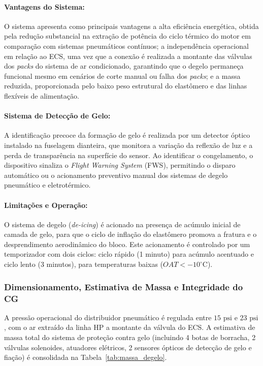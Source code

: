 \paragraph{Vantagens do Sistema:} O sistema apresenta como principais vantagens a alta eficiência energética, obtida pela redução substancial na extração de potência do ciclo térmico do motor em comparação com sistemas pneumáticos contínuos; a independência operacional em relação ao ECS, uma vez que a conexão é realizada a montante das válvulas dos \textit{packs} do sistema de ar condicionado, garantindo que o degelo permaneça funcional mesmo em cenários de corte manual ou falha dos \textit{packs}; e a massa reduzida, proporcionada pelo baixo peso estrutural do elastômero e das linhas flexíveis de alimentação.

\paragraph{Sistema de Detecção de Gelo:} A identificação precoce da formação de gelo é realizada por um detector óptico instalado na fuselagem dianteira, que monitora a variação da reflexão de luz e a perda de transparência na superfície do sensor. Ao identificar o congelamento, o dispositivo sinaliza o \textit{Flight Warning System} (FWS), permitindo o disparo automático ou o acionamento preventivo manual dos sistemas de degelo pneumático e eletrotérmico.

\paragraph{Limitações e Operação:} O sistema de degelo (\textit{de-icing}) é acionado na presença de acúmulo inicial de camada de gelo, para que o ciclo de inflação do elastômero promova a fratura e o desprendimento aerodinâmico do bloco. Este acionamento é controlado por um temporizador com dois ciclos: ciclo rápido (1 minuto) para acúmulo acentuado e ciclo lento (3 minutos), para temperaturas baixas ($OAT < -10^\circ\text{C}$).

\subsubsection{Dimensionamento, Estimativa de Massa e Integridade do CG}

A pressão operacional do distribuidor pneumático é regulada entre $15\text{ psi}$ e $23\text{ psi}$, com o ar extraído da linha HP a montante da válvula do ECS. A estimativa de massa total do sistema de proteção contra gelo (incluindo 4 botas de borracha, 2 válvulas solenoides, atuadores elétricos, 2 sensores ópticos de detecção de gelo e fiação) é consolidada na Tabela~\ref{tab:massa_degelo}.


